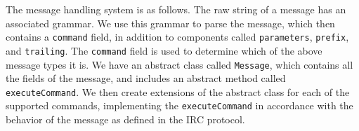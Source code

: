 \documentclass{article}
\begin{document}
The message handling system is as follows.  The raw string of a message has an associated
grammar.  We use this grammar to parse the message, which then contains a \texttt{command}
field, in addition to components called \texttt{parameters}, \texttt{prefix}, and \texttt{trailing}.
The \texttt{command} field is used to determine which of the above message types it is.
We have an abstract class called \texttt{Message}, which contains all the fields of the message,
and includes an abstract method called \texttt{executeCommand}.  We then create extensions of the
abstract class for each of the supported commands, implementing the \texttt{executeCommand} in
accordance with the behavior of the message as defined in the IRC protocol.
\end{document}
